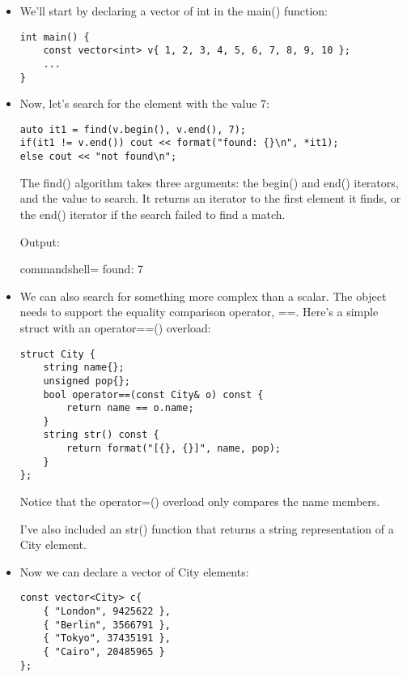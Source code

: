 \begin{itemize}
\item 
We'll start by declaring a vector of int in the main() function:

\begin{lstlisting}[style=styleCXX]
int main() {
	const vector<int> v{ 1, 2, 3, 4, 5, 6, 7, 8, 9, 10 };
	...
}
\end{lstlisting}

\item 
Now, let's search for the element with the value 7:

\begin{lstlisting}[style=styleCXX]
auto it1 = find(v.begin(), v.end(), 7);
if(it1 != v.end()) cout << format("found: {}\n", *it1);
else cout << "not found\n";
\end{lstlisting}

The find() algorithm takes three arguments: the begin() and end() iterators, and the value to search. It returns an iterator to the first element it finds, or the end() iterator if the search failed to find a match.

Output:

\begin{tcblisting}{commandshell={}}
found: 7
\end{tcblisting}

\item 
We can also search for something more complex than a scalar. The object needs to support the equality comparison operator, ==. Here's a simple struct with an operator==() overload:

\begin{lstlisting}[style=styleCXX]
struct City {
	string name{};
	unsigned pop{};
	bool operator==(const City& o) const {
		return name == o.name;
	}
	string str() const {
		return format("[{}, {}]", name, pop);
	}
};
\end{lstlisting}

Notice that the operator=() overload only compares the name members.

I've also included an str() function that returns a string representation of a City element.

\item 
Now we can declare a vector of City elements:

\begin{lstlisting}[style=styleCXX]
const vector<City> c{
	{ "London", 9425622 },
	{ "Berlin", 3566791 },
	{ "Tokyo", 37435191 },
	{ "Cairo", 20485965 }
};
\end{lstlisting}


\end{itemize}
